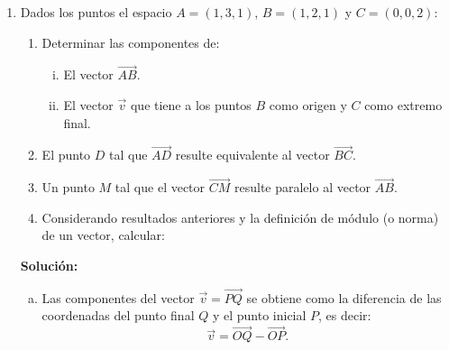 \documentclass[11pt,a4paper]{article}
\begin{document}
\begin{enumerate}[\hspace{-5mm} 1) ]
\bigskip 



\item   Dados los puntos el espacio $A = (1, 3, 1)$, $B = (1, 2, 1)$ y $C = (0, 0, 2)$: 

    \begin{enumerate}[ a)] 
        \item Determinar las componentes de:
            \begin{enumerate}[i)]
                \item El vector $\overrightarrow{AB}$.
                \item El vector $\vec{v}$ que tiene a los puntos $B$ como origen y $C$ como extremo final.
            \end{enumerate}
        \item El punto $D$ tal que $\overrightarrow{AD}$ resulte equivalente al vector $\overrightarrow{BC}$.
        \item  Un punto $M$ tal que el vector $\overrightarrow{CM}$ resulte paralelo al vector $\overrightarrow{AB}$. 
        \item Considerando resultados anteriores y la definición de módulo (o norma) de un vector, calcular:
    \end{enumerate}








\textbf{Solución:}
\begin{enumerate}[a)]
\item  Las componentes del vector $\vec{v}= \overrightarrow{PQ}$ se obtiene como la diferencia de las coordenadas del punto final $Q$ y el punto inicial $P$, es decir:
\[
\vec{v} = \overrightarrow{OQ} -\overrightarrow{OP}.
\] 
    \begin{enumerate}[ i)] 


\end{enumerate}
\end{enumerate}
\end{enumerate}
\end{document}
